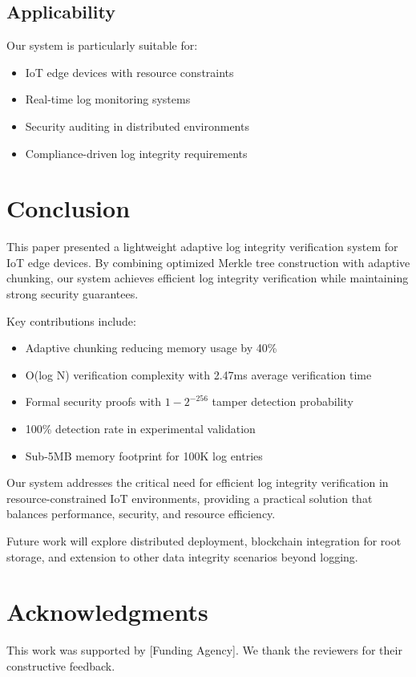 \documentclass[a4paper,10pt]{article}
\begin{document}
\subsection{Applicability}

Our system is particularly suitable for:
\begin{itemize}
\item IoT edge devices with resource constraints
\item Real-time log monitoring systems
\item Security auditing in distributed environments
\item Compliance-driven log integrity requirements
\end{itemize}

\section{Conclusion}
\label{sec:conclusion}

This paper presented a lightweight adaptive log integrity verification system for IoT edge devices. By combining optimized Merkle tree construction with adaptive chunking, our system achieves efficient log integrity verification while maintaining strong security guarantees.

Key contributions include:
\begin{itemize}
\item Adaptive chunking reducing memory usage by 40\%
\item O(log N) verification complexity with 2.47ms average verification time
\item Formal security proofs with $1 - 2^{-256}$ tamper detection probability
\item 100\% detection rate in experimental validation
\item Sub-5MB memory footprint for 100K log entries
\end{itemize}

Our system addresses the critical need for efficient log integrity verification in resource-constrained IoT environments, providing a practical solution that balances performance, security, and resource efficiency.

Future work will explore distributed deployment, blockchain integration for root storage, and extension to other data integrity scenarios beyond logging.

\section{Acknowledgments}

This work was supported by [Funding Agency]. We thank the reviewers for their constructive feedback.



\end{document}
